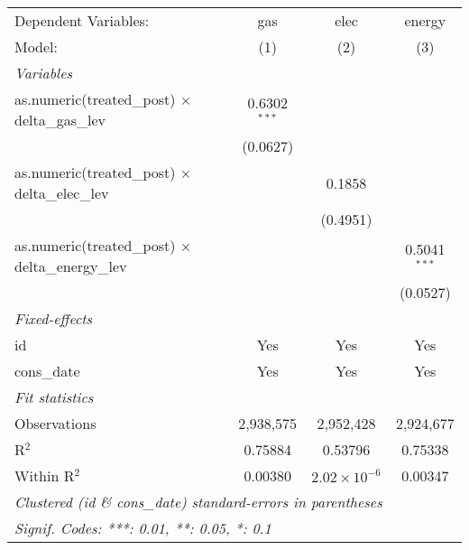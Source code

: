 
\begingroup
\centering
\begin{tabular}{lccc}
   \tabularnewline \midrule \midrule
   Dependent Variables:                                      & gas            & elec                  & energy\\  
   Model:                                                    & (1)            & (2)                   & (3)\\  
   \midrule
   \emph{Variables}\\
   as.numeric(treated\_post) $\times$ delta\_gas\_lev        & 0.6302$^{***}$ &                       &   \\   
                                                             & (0.0627)       &                       &   \\   
   as.numeric(treated\_post) $\times$ delta\_elec\_lev       &                & 0.1858                &   \\   
                                                             &                & (0.4951)              &   \\   
   as.numeric(treated\_post) $\times$ delta\_energy\_lev     &                &                       & 0.5041$^{***}$\\   
                                                             &                &                       & (0.0527)\\   
   \midrule
   \emph{Fixed-effects}\\
   id                                                        & Yes            & Yes                   & Yes\\  
   cons\_date                                                & Yes            & Yes                   & Yes\\  
   \midrule
   \emph{Fit statistics}\\
   Observations                                              & 2,938,575      & 2,952,428             & 2,924,677\\  
   R$^2$                                                     & 0.75884        & 0.53796               & 0.75338\\  
   Within R$^2$                                              & 0.00380        & $2.02\times 10^{-6}$  & 0.00347\\  
   \midrule \midrule
   \multicolumn{4}{l}{\emph{Clustered (id \& cons\_date) standard-errors in parentheses}}\\
   \multicolumn{4}{l}{\emph{Signif. Codes: ***: 0.01, **: 0.05, *: 0.1}}\\
\end{tabular}
\par\endgroup


